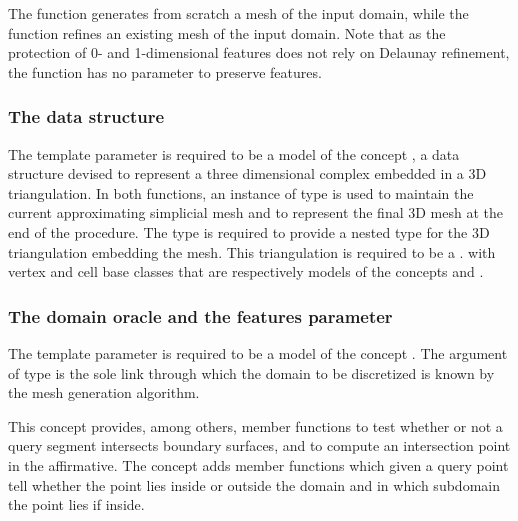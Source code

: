 

The function  generates from scratch a mesh
of the input domain, while
the function  refines
an existing mesh of the input domain. Note that as the protection
of 0- and 1-dimensional features does not rely on Delaunay 
refinement, the function  has no parameter
to preserve features.


\subsubsection{The data structure}
The template parameter  is required to be a model of
the concept 
, a data structure devised to
represent a three dimensional complex embedded in a 3D
triangulation. In both functions,  an instance  of type  is used to maintain the current
approximating simplicial mesh 
and to represent the final  3D mesh at the end
of the procedure.
The type  is   required to provide a nested type
 for the 3D triangulation
embedding the mesh. 
This triangulation is required to be a .
with  vertex and cell base classes  that are    respectively  models of the
concepts  and .

\subsubsection{The domain oracle and the features parameter}
The template parameter  is required to be a model of
the concept  . The argument  of type
 is the sole link through which the domain
to be discretized is known  by the mesh generation algorithm. 

This concept  provides, among others,
  member functions to test whether or not
a query segment intersects boundary surfaces,
and to compute an intersection point  in the affirmative.
The  concept adds  member functions 
which given a query point tell whether the point lies
inside or outside the domain and in which subdomain the point lies
if inside.

